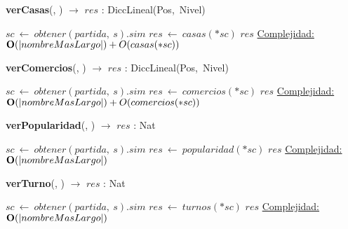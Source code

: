 \begin{Algoritmos}
    \begin{algorithm}[H]{\textbf{verCasas}(, ) $\to$ $res$ : DiccLineal(Pos,\ Nivel)}
    \begin{algorithmic}[1]
        \State $sc\ \leftarrow\ obtener(partida,\ s).sim$
        \State $res\ \leftarrow\ casas(*sc)$
        \State \Return $res$
        \medskip
        \Statex \underline{Complejidad:} $\bold{O}(|nombreMasLargo|) + O(casas(*sc))$
    \end{algorithmic}
    \end{algorithm}

    \begin{algorithm}[H]{\textbf{verComercios}(, ) $\to$ $res$ : DiccLineal(Pos,\ Nivel)}
    \begin{algorithmic}[1]
        \State $sc\ \leftarrow\ obtener(partida,\ s).sim$
        \State $res\ \leftarrow\ comercios(*sc)$
        \State \Return $res$
        \medskip
        \Statex \underline{Complejidad:} $\bold{O}(|nombreMasLargo|) + O(comercios(*sc))$
    \end{algorithmic}
    \end{algorithm}

    \begin{algorithm}[H]{\textbf{verPopularidad}(, ) $\to$ $res$ : Nat}
    \begin{algorithmic}[1]
        \State $sc\ \leftarrow\ obtener(partida,\ s).sim$
        \State $res\ \leftarrow\ popularidad(*sc)$
        \State \Return $res$
        \medskip
        \Statex \underline{Complejidad:} $\bold{O}(|nombreMasLargo|)$
    \end{algorithmic}
    \end{algorithm}

    \begin{algorithm}[H]{\textbf{verTurno}(, ) $\to$ $res$ : Nat}
    \begin{algorithmic}[1]
        \State $sc\ \leftarrow\ obtener(partida,\ s).sim$
        \State $res\ \leftarrow\ turnos(*sc)$
        \State \Return $res$
        \medskip
        \Statex \underline{Complejidad:} $\bold{O}(|nombreMasLargo|)$
    \end{algorithmic}
    \end{algorithm}

\end{Algoritmos}
